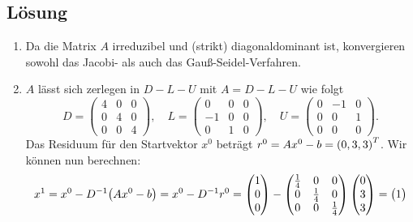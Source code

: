 \documentclass{exercise}
\begin{document}
    \subsection*{Lösung}
    \begin{enumerate}
        \item Da die Matrix \(A\) irreduzibel und (strikt) diagonaldominant ist, konvergieren sowohl das Jacobi- als auch das Gauß-Seidel-Verfahren.
        \item \(A\) lässt sich zerlegen in \(D - L - U\) mit \(A = D - L - U\) wie folgt
        \[
            D = \begin{pmatrix}
                4 & 0 & 0\\
                0 & 4 & 0\\
                0 & 0 & 4
            \end{pmatrix}, \quad L = \begin{pmatrix}
                0 & 0 & 0\\
                -1 & 0 & 0\\
                0 & 1 & 0
            \end{pmatrix}, \quad U = \begin{pmatrix}
                0 & -1 & 0\\
                0 & 0 & 1\\
                0 & 0 & 0
            \end{pmatrix}.
        \]
        Das Residuum für den Startvektor \(x^0\) beträgt \(r^0 = Ax^0 - b = \parentheses*{0, 3, 3}^T\).
        Wir können nun berechnen:
        \[
            x^1 = x^0 - D^{-1}\parentheses*{Ax^0 - b} = x^0 - D^{-1}r^0 = \begin{pmatrix}
                1\\
                0\\
                0
            \end{pmatrix} - \begin{pmatrix}
                \frac{1}{4} & 0 & 0\\
                0 & \frac{1}{4} & 0\\
                0 & 0 & \frac{1}{4}
            \end{pmatrix}\begin{pmatrix}
                0\\
                3\\
                3
            \end{pmatrix} = \begin{pmatrix}
                1\\

\end{pmatrix}\]
\end{enumerate}
\end{document}
